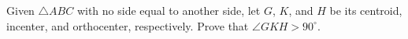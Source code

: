 Given $\triangle ABC$ with no side equal to another side, let $G$, $K$, and $H$ be its centroid, incenter, and orthocenter, respectively. Prove that $\angle GKH > 90^\circ$.
